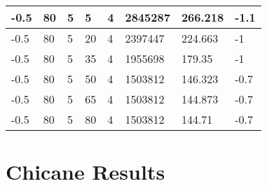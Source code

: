 \begin{longtable}{|p{1.4cm}|p{1.4cm}|p{1.4cm}|p{1.4cm}|p{1.4cm}|p{1.4cm}|p{1.4cm}|p{1.5cm}|}
        -0.5 & 80 & 5 & 5 & 4 & 2845287 & 266.218 & -1.1 \\ \hline
        -0.5 & 80 & 5 & 20 & 4 & 2397447 & 224.663 & -1 \\ \hline
        -0.5 & 80 & 5 & 35 & 4 & 1955698 & 179.35 & -1 \\ \hline
        -0.5 & 80 & 5 & 50 & 4 & 1503812 & 146.323 & -0.7 \\ \hline
        -0.5 & 80 & 5 & 65 & 4 & 1503812 & 144.873 & -0.7 \\ \hline
        -0.5 & 80 & 5 & 80 & 4 & 1503812 & 144.71 & -0.7 \\ \hline
\end{longtable}
\pagebreak
\section{Chicane Results}

